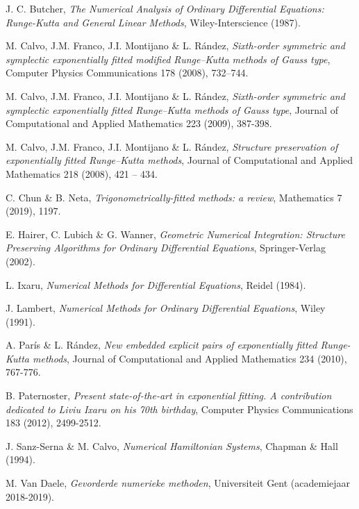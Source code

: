 \documentclass[12pt]{article}
\begin{document}
\newpage
\begin{thebibliography}{9}
    
    J. C. Butcher,
    \textit{The Numerical Analysis of Ordinary Differential Equations: Runge-Kutta and General Linear Methods},
    Wiley-Interscience (1987).

	M. Calvo, J.M. Franco, J.I. Montijano \& L. Rández,
	\textit{Sixth-order symmetric and symplectic exponentially fitted modified Runge–Kutta methods of Gauss type},
	Computer Physics Communications 178 (2008), 732–744.
	
	M. Calvo, J.M. Franco, J.I. Montijano \& L. Rández,
	\textit{Sixth-order symmetric and symplectic exponentially fitted Runge–Kutta methods of Gauss type},
    Journal of Computational and Applied Mathematics 223 (2009), 387-398.
	
	M. Calvo, J.M. Franco, J.I. Montijano \& L. Rández,
	\textit{Structure preservation of exponentially fitted Runge–Kutta methods},
	Journal of Computational and Applied Mathematics 218 (2008), 421 – 434.
	
	C. Chun \& B. Neta,
	\textit{Trigonometrically-fitted methods: a review},
	Mathematics 7 (2019), 1197.
	
	E. Hairer, C. Lubich \& G. Wanner,
	\textit{Geometric Numerical Integration: Structure Preserving Algorithms for Ordinary Differential Equations},
	Springer-Verlag (2002).
	
	L. Ixaru,
	\textit{Numerical Methods for Differential Equations},
	Reidel (1984).
	
	J. Lambert,
	\textit{Numerical Methods for Ordinary Differential Equations},
	Wiley (1991).
	
	A. París \& L. Rández,
	\textit{New embedded explicit pairs of exponentially fitted Runge-Kutta methods},
	Journal of Computational and Applied Mathematics 234 (2010), 767-776.
	
	B. Paternoster,
	\textit{Present state-of-the-art in exponential fitting. A contribution dedicated to Liviu Ixaru on his 70th birthday},
	Computer Physics Communications 183 (2012), 2499-2512.
	
	J. Sanz-Serna \& M. Calvo,
	\textit{Numerical Hamiltonian Systems},
	Chapman \& Hall (1994).
	
	M. Van Daele,
	\textit{Gevorderde numerieke methoden},
	Universiteit Gent (academiejaar 2018-2019).
	

\end{thebibliography}
\end{document}
